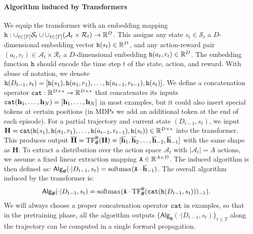\documentclass[10pt]{article}
\renewcommand{\bar}{\overline}
\newcommand{\<}{\left\langle}
\renewcommand{\>}{\right\rangle}
\newcommand{\TF}{{\rm TF}}
\newcommand{\R}{\mathbb{R}}
\newcommand{\state}{{s}}
\newcommand{\action}{{a}}
\newcommand{\reward}{{r}}
\newcommand{\totlen}{{T}}
\newcommand{\cat}{{\tt cat}}
\newcommand{\extractmap}{{\tt A}}
\newcommand{\embedmap}{{\tt h}}
\newcommand{\softmax}{{\rm softmax}}
\newcommand{\sAlg}{{\mathsf{Alg}}}
\newcommand{\dset}{{D}}
\newcommand{\statesp}{{\mathcal{S}}}
\newcommand{\actionsp}{{\mathcal{A}}}
\newcommand{\rewardsp}{{\mathcal{R}}}
\newcommand{\clipval}{{\mathsf{R}}}
\newcommand{\Numact}{{A}}
\def\bH{{\mathbf H}}
\def\btheta{{\boldsymbol \theta}}
\def\bh{{\mathbf h}}
\begin{document}
\paragraph{Algorithm induced by Transformers} We equip the transformer with an embedding mapping $\embedmap: \cup_{t \in [\totlen]} \statesp_t \cup \cup_{t \in [\totlen]} (\actionsp_t \times \rewardsp_t) \to \R^D$.  This assigns any state $\state_t \in \statesp_t$ a $D$-dimensional embedding vector $\embedmap(\state_t) \in \R^D$, and any action-reward pair $(\action_t, \reward_t) \in \actionsp_t \times \rewardsp_t$ a $D$-dimensional embedding $\embedmap(\action_t, \reward_t) \in \R^D$. The embedding function $\embedmap$ should encode the time step $t$ of the state, action, and reward. With abuse of notation, we denote $\embedmap(\dset_{t-1}, \state_t) = [\embedmap(\state_1), \embedmap(\action_1, \reward_1), \ldots, \embedmap(\action_{t-1}, \reward_{t-1}), \embedmap(\state_t)]$. We define a concatenation operator $\cat: \R^{D \times *} \to \R^{D \times *}$ that concatenates its inputs $\cat(\bh_1, \ldots, \bh_N) = [\bh_1, \ldots, \bh_N]$ in most examples, but it could also insert special tokens at certain positions (in MDPs we add an additional token at the end of each episode). For a partial trajectory and current state $(\dset_{t-1}, \state_t)$, we input $\bH = \cat(\embedmap(\state_1), \embedmap(\action_1, \reward_1), \ldots, \embedmap(\action_{t-1}, \reward_{t-1}), \embedmap(\state_t)) \in \R^{D \times *}$ into the transformer. This produces output $\bar{\bH} = \TF_{\btheta}^{\clipval}(\bH) = [\bar{\bh}_1, \bar{\bh}_2 \ldots, \bar{\bh}_{-2},\bar{\bh}_{-1}]$ with the same shape as $\bH$. To extract a distribution over the action space $\actionsp_t$ with $| \actionsp_t | = \Numact$ actions, we assume a fixed linear extraction mapping $\extractmap \in \R^{\Numact \times D}$. The induced algorithm is then defined as: $\sAlg_\btheta(\cdot | \dset_{t-1}, \state_t) = \softmax(\extractmap \cdot \bar{\bh}_{-1})$. The overall algorithm induced by the transformer is:
\begin{equation}\label{eqn:transformer-algorithm}
\sAlg_\btheta(\cdot | \dset_{t-1}, \state_t) = \softmax ( {\extractmap} \cdot {\TF_\btheta^{\clipval}} ( {\cat}( {\embedmap} ( \dset_{t-1}, \state_t)))_{-1}).
\end{equation}
We will always choose a proper concatenation operator $\cat$ in examples, so that in the pretraining phase, all the algorithm outputs $\{ \sAlg_\btheta(\cdot | \dset_{t-1}, \state_t) \}_{t \le \totlen}$ along the trajectory can be computed in a single forward propagation.
\end{document}
